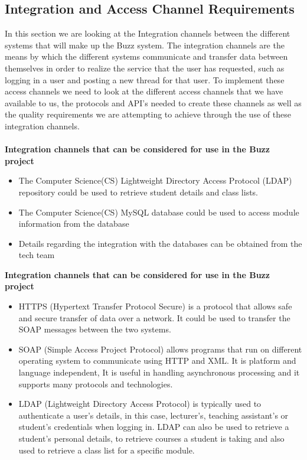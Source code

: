 \documentclass[a4paper]{article}
\begin{document}
\subsection{Integration and Access Channel Requirements}
In this section we are looking at the Integration channels between the different systems that will make up the Buzz system. The integration channels are the means by which the different systems communicate and transfer data between themselves in order to realize the service that the user has requested, such as logging in a user and posting a new thread for that user. To implement these access channels we need to look at the different access channels that we have available to us, the protocols and API’s needed to create these channels as well as the quality requirements we are attempting to achieve through the use of these integration channels.
\\
\\\textbf{Integration channels that can be considered for use in the Buzz project}
\begin{itemize}
	\item The Computer Science(CS) Lightweight Directory Access Protocol (LDAP) repository could be used to retrieve student details and class lists.
	\item The Computer Science(CS) MySQL database could be used to access module information from the database
	\item Details regarding the integration with the databases can be obtained from the tech team 
\end{itemize}
\textbf{Integration channels that can be considered for use in the Buzz project}
\begin{itemize}
	\item HTTPS (Hypertext Transfer Protocol Secure) is a protocol that allows safe and secure transfer of data over a network. It could be used to transfer the SOAP messages between the two systems.
	\item SOAP (Simple Access Project Protocol) allows programs that run on different operating system to communicate using HTTP and XML. It is platform and language independent, It is useful in handling asynchronous processing and it supports many protocols and technologies.
	\item LDAP (Lightweight Directory Access Protocol) is typically  used to authenticate a user’s details, in this case, lecturer’s, teaching assistant’s or student’s credentials when logging in. LDAP can also be used to retrieve a student’s personal details, to retrieve courses a student is taking and also used to retrieve a class list for a specific module.
\end{itemize}
\end{document}
